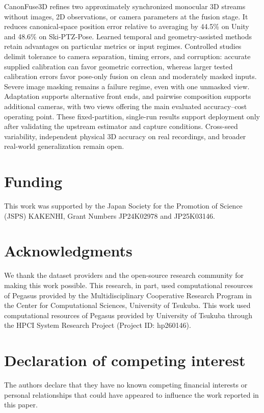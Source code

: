 \documentclass[preprint,12pt]{elsarticle}
\begin{document}
CanonFuse3D refines two approximately synchronized monocular 3D streams without images, 2D observations, or camera parameters at the fusion stage. It reduces canonical-space position error relative to averaging by 44.5\% on Unity and 48.6\% on Ski-PTZ-Pose. Learned temporal and geometry-assisted methods retain advantages on particular metrics or input regimes. Controlled studies delimit tolerance to camera separation, timing errors, and corruption: accurate supplied calibration can favor geometric correction, whereas larger tested calibration errors favor pose-only fusion on clean and moderately masked inputs. Severe image masking remains a failure regime, even with one unmasked view. Adaptation supports alternative front ends, and pairwise composition supports additional cameras, with two views offering the main evaluated accuracy--cost operating point. These fixed-partition, single-run results support deployment only after validating the upstream estimator and capture conditions. Cross-seed variability, independent physical 3D accuracy on real recordings, and broader real-world generalization remain open.

\section*{Funding}
This work was supported by the Japan Society for the Promotion of Science (JSPS) KAKENHI, Grant Numbers JP24K02978 and JP25K03146.

\section*{Acknowledgments}
We thank the dataset providers and the open-source research community for making this work possible. This research, in part, used computational resources of Pegasus provided by the Multidisciplinary Cooperative Research Program in the Center for Computational Sciences, University of Tsukuba. This work used computational resources of Pegasus provided by University of Tsukuba through the HPCI System Research Project (Project ID: hp260146).

\section*{Declaration of competing interest}
The authors declare that they have no known competing financial interests or personal relationships that could have appeared to influence the work reported in this paper.
\end{document}
